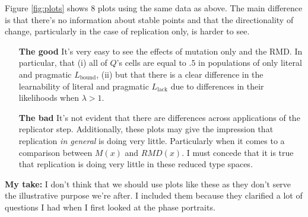 \documentclass[fleqn,reqno,10pt]{article}
\newcommand{\mylang}[1]{\ensuremath{L_{\text{#1}}}\xspace} %
\newcommand{\Lbound}{\mylang{bound}}
\newcommand{\Llack}{\mylang{lack}}
\begin{document}
Figure \ref{fig:plots} shows $8$ plots using the same data as above. The main difference is that there's no information about stable points and that the directionality of change, particularly in the case of replication only, is harder to see.

\begin{itemize}
\item[{\bf The good}] It's very easy to see the effects of mutation only and the RMD. In particular, that (i) all of $Q$'s cells are equal to $.5$ in populations of only literal and pragmatic $\Lbound$, (ii) but that there is a clear difference in the learnability of literal and pragmatic $\Llack$ due to differences in their likelihoods when $\lambda > 1$.
\item[{\bf The bad}] It's not evident that there are differences across applications of the replicator step. Additionally, these plots may give the impression that replication {\em in general} is doing very little. Particularly when it comes to a comparison between $M(x)$ and $RMD(x)$. I must concede that it is true that replication is doing very little in these reduced type spaces.
\end{itemize}

{\bf My take:} I don't think that we should use plots like these as they don't serve the illustrative purpose we're after. I included them because they clarified a lot of questions I had when I first looked at the phase portraits. 
\end{document}
